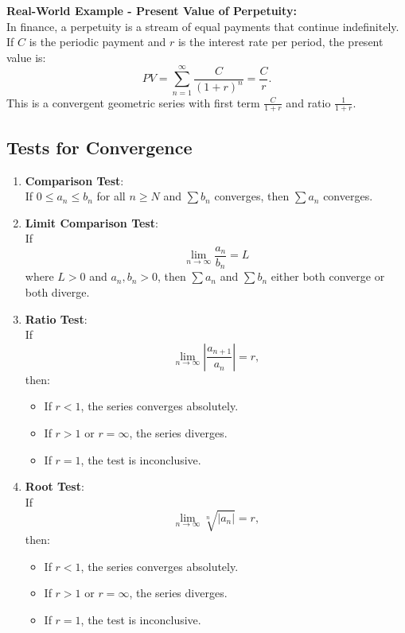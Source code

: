 \documentclass{article}
\begin{document}
\textbf{Real-World Example - Present Value of Perpetuity:} \\
In finance, a perpetuity is a stream of equal payments that continue indefinitely. If $C$ is the periodic payment and $r$ is the interest rate per period, the present value is:
\[
PV = \sum_{n=1}^{\infty} \frac{C}{(1+r)^n} = \frac{C}{r}.
\]
This is a convergent geometric series with first term $\frac{C}{1+r}$ and ratio $\frac{1}{1+r}$.

\subsection{Tests for Convergence} \label{convergence-tests}

\begin{enumerate}[label=\textbf{\arabic*.}]
    \item \textbf{Comparison Test}: \\
    If $0 \leq a_n \leq b_n$ for all $n \geq N$ and $\sum b_n$ converges, then $\sum a_n$ converges.
    
    \item \textbf{Limit Comparison Test}: \\
    If 
    \[
    \lim_{n \to \infty} \frac{a_n}{b_n} = L
    \]
    where $L > 0$ and $a_n, b_n > 0$, then $\sum a_n$ and $\sum b_n$ either both converge or both diverge.
    
    \item \textbf{Ratio Test}: \\
    If 
    \[
    \lim_{n \to \infty} \left|\frac{a_{n+1}}{a_n}\right| = r,
    \]
    then:
    \begin{itemize}
        \item If $r < 1$, the series converges absolutely.
        \item If $r > 1$ or $r = \infty$, the series diverges.
        \item If $r = 1$, the test is inconclusive.
    \end{itemize}
    
    \item \textbf{Root Test}: \\
    If 
    \[
    \lim_{n \to \infty} \sqrt[n]{|a_n|} = r,
    \]
    then:
    \begin{itemize}
        \item If $r < 1$, the series converges absolutely.
        \item If $r > 1$ or $r = \infty$, the series diverges.
        \item If $r = 1$, the test is inconclusive.
    \end{itemize}
    

\end{enumerate}
\end{document}
